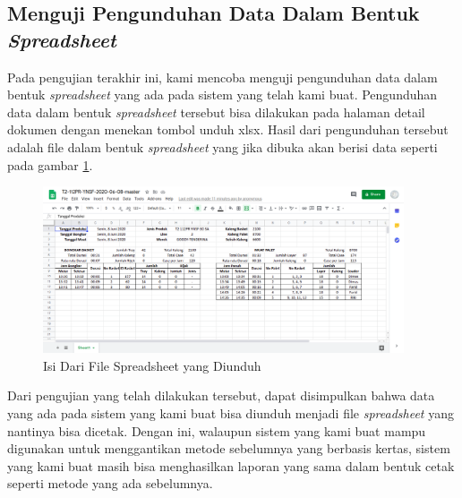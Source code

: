 \subsection{Menguji Pengunduhan Data Dalam Bentuk \emph{Spreadsheet}}
\vspace{1ex}

Pada pengujian terakhir ini, kami mencoba menguji pengunduhan data dalam bentuk \emph{spreadsheet} yang ada pada sistem yang telah kami buat.
Pengunduhan data dalam bentuk \emph{spreadsheet} tersebut bisa dilakukan pada halaman detail dokumen dengan menekan tombol unduh xlsx.
Hasil dari pengunduhan tersebut adalah file dalam bentuk \emph{spreadsheet} yang jika dibuka akan berisi data seperti pada gambar \ref{fig:isiSpreadsheet}.
\vspace{0.5ex}

\newpage

\begin{figure} [ht!] \centering
  \includegraphics[width=0.95\textwidth]{gambar/isi-spreadsheet.png}
  \caption{Isi Dari File Spreadsheet yang Diunduh}
	\label{fig:isiSpreadsheet}
\end{figure}

Dari pengujian yang telah dilakukan tersebut, dapat disimpulkan bahwa data yang ada pada sistem yang kami buat bisa diunduh menjadi file \emph{spreadsheet} yang nantinya bisa dicetak.
Dengan ini, walaupun sistem yang kami buat mampu digunakan untuk menggantikan metode sebelumnya yang berbasis kertas, sistem yang kami buat masih bisa menghasilkan laporan yang sama dalam bentuk cetak seperti metode yang ada sebelumnya.
\vspace{0.5ex}